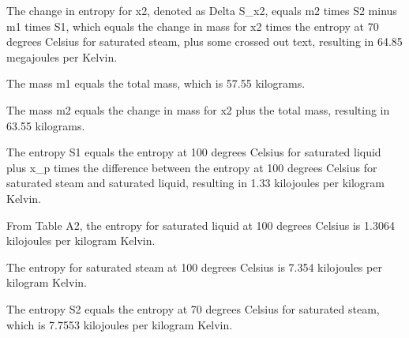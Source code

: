 The change in entropy for x2, denoted as Delta S_x2, equals m2 times S2 minus m1 times S1, which equals the change in mass for x2 times the entropy at 70 degrees Celsius for saturated steam, plus some crossed out text, resulting in 64.85 megajoules per Kelvin.

The mass m1 equals the total mass, which is 57.55 kilograms.

The mass m2 equals the change in mass for x2 plus the total mass, resulting in 63.55 kilograms.

The entropy S1 equals the entropy at 100 degrees Celsius for saturated liquid plus x_p times the difference between the entropy at 100 degrees Celsius for saturated steam and saturated liquid, resulting in 1.33 kilojoules per kilogram Kelvin.

From Table A2, the entropy for saturated liquid at 100 degrees Celsius is 1.3064 kilojoules per kilogram Kelvin.

The entropy for saturated steam at 100 degrees Celsius is 7.354 kilojoules per kilogram Kelvin.

The entropy S2 equals the entropy at 70 degrees Celsius for saturated steam, which is 7.7553 kilojoules per kilogram Kelvin.